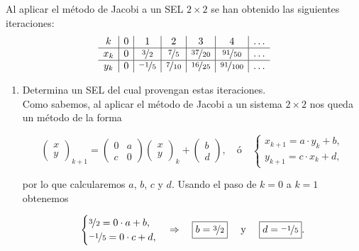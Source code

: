\documentclass[12pt]{article}
\begin{document}
	\begin{ejercicio}
		Al aplicar el método de Jacobi a un SEL $2 \times 2$ se han obtenido las siguientes iteraciones:
		$$ \begin{array}{c|c|c|c|c|c|c}
			k & 0 & 1 & 2 & 3 & 4 & \ldots \\
			\hline
			x_k & 0 & \nicefrac{3}{2} & \nicefrac{7}{5} & \nicefrac{37}{20} & \nicefrac{91}{50} & \ldots \\
			\hline
			y_k & 0 & \nicefrac{-1}{5} & \nicefrac{7}{10} & \nicefrac{16}{25} & \nicefrac{91}{100} & \ldots 
		\end{array}$$
		
		\begin{enumerate}[label=\alph*)]
			\item Determina un SEL del cual provengan estas iteraciones. \\
			
				Como sabemos, al aplicar el método de Jacobi a un sistema $2 \times 2$ nos queda un método de la forma
				
				$$\begin{pmatrix}
					x \\
					y
				\end{pmatrix}_{k+1}
				=
				\begin{pmatrix}
					0 & a \\
					c & 0
				\end{pmatrix}
				\begin{pmatrix}
					x \\
					y
				\end{pmatrix}_k
				+
				\begin{pmatrix}
					b \\
					d
				\end{pmatrix}, \quad \text{ó} \quad 
				\begin{cases}
					x_{k+1} = a \cdot y_k + b, \\
					y_{k+1} = c \cdot x_k + d,
				\end{cases}$$
				
				por lo que calcularemos $a$, $b$, $c$ y $d$. Usando el paso de $k=0$ a $k=1$ obtenemos
				
				$$\begin{cases}
					\nicefrac{3}{2} = 0 \cdot a + b, \\
					\nicefrac{-1}{5} = 0 \cdot c + d,
				\end{cases} \Rightarrow \quad \boxed{b = \nicefrac{3}{2}}\quad \text{ y } \quad \boxed{d = \nicefrac{-1}{5}}.$$
				

\end{enumerate}
\end{ejercicio}
\end{document}
